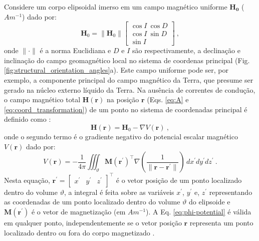Considere um corpo elipsoidal imerso em um campo magnético uniforme $\mathbf{{H}_{0}}$ ($\unit{Am^{-1}}$) dado por:
\begin{equation}
\mathbf{H}_{0} = \| \mathbf{H}_{0} \| \left[
\begin{array}{c}
\cos I \: \cos D \\
\cos I \: \sin D \\
\sin I
\end{array}
\right] \: ,
\label{eq:H0}
\end{equation}
onde $\| \cdot \|$ é a norma Euclidiana e $D$ e $I$ são respectivamente, a declinação e inclinação do campo geomagnético local no sistema de coordenas principal (Fig. \ref{fig:structural_orientation_angles}a). Este campo uniforme pode ser, por exemplo, a componente principal do campo magnético da Terra, que presume ser gerado na núcleo externo líquido da Terra. Na ausência de correntes de condução, o campo magnético total $\mathbf{H}(\mathbf{r})$ na posição $\mathbf{r}$ (Eqs. \ref{eq:A} e
\ref{eq:coord_transformation}) de um ponto no sistema de coordenadas principal é definido como \citep{sharma1966, eskola1980, reitz1992, sttraton2007}:
\begin{equation}
\mathbf{H}(\mathbf{r}) = \mathbf{H}_{0} - \nabla V(\mathbf{r}) \: ,
\label{eq:H}
\end{equation}
onde o segundo termo é o gradiente negativo do potencial escalar magnético $V(\mathbf{r})$ dado por:
\begin{equation}
V(\mathbf{r}) = -\frac{1}{4\pi} \iiint_{\vartheta} 
\mathbf{M}(\mathbf{r}^{\prime})^{\top} 
\nabla \left(
\frac{1}{\| \mathbf{r} - \mathbf{r}^{\prime} \|}
\right) \, dx^{\prime}dy^{\prime}dz^{\prime} \: .
\label{eq:phi-potential}
\end{equation}
Nesta equação, $\mathbf{r}^{\prime} = [\begin{array}{ccc} 
x^{\prime} & y^{\prime} & z^{\prime} \end{array} ]^{\top}$
é o vetor posição de um ponto localizado dentro do volume $\vartheta$, 
a integral é feita sobre as variáveis $x^{\prime}$, $y^{\prime}$ e, 
$z^{\prime}$ representando as coordenadas de um ponto localizado dentro do volume $\vartheta$ do elipsoide e 
$\mathbf{M}(\mathbf{r}^{\prime})$ é o vetor de magnetização
(em $\unit{Am^{-1}}$).
A Eq. \ref{eq:phi-potential} é válida em qualquer ponto, 
independentemente se o vetor posição $\mathbf{r}$ representa
um ponto localizado dentro ou fora do corpo magnetizado \citep{dubois1896}.


